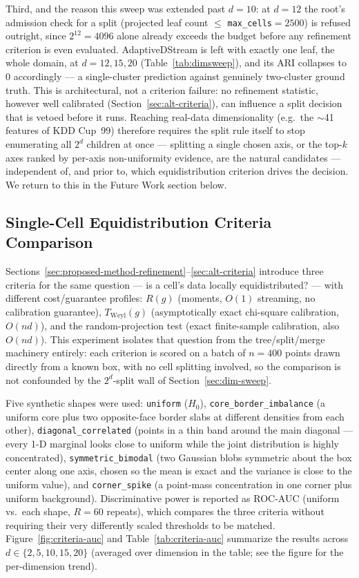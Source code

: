\documentclass[11pt]{article}
\begin{document}
Third, and the reason this sweep was extended past $d=10$: at $d=12$ the root's admission check for a split (projected leaf count $\le$ \texttt{max\_cells}$=2500$) is refused outright, since $2^{12}=4096$ alone already exceeds the budget before any refinement criterion is even evaluated. AdaptiveDStream is left with exactly one leaf, the whole domain, at $d=12,15,20$ (Table~\ref{tab:dimsweep}), and its ARI collapses to $0$ accordingly — a single-cluster prediction against genuinely two-cluster ground truth. This is architectural, not a criterion failure: no refinement statistic, however well calibrated (Section~\ref{sec:alt-criteria}), can influence a split decision that is vetoed before it runs. Reaching real-data dimensionality (e.g.\ the $\sim$41 features of KDD Cup~99) therefore requires the split rule itself to stop enumerating all $2^d$ children at once — splitting a single chosen axis, or the top-$k$ axes ranked by per-axis non-uniformity evidence, are the natural candidates — independent of, and prior to, which equidistribution criterion drives the decision. We return to this in the Future Work section below.

\subsection{Single-Cell Equidistribution Criteria Comparison}
\label{sec:criteria-comparison}

Sections~\ref{sec:proposed-method-refinement}--\ref{sec:alt-criteria} introduce three criteria for the same question — is a cell's data locally equidistributed? — with different cost/guarantee profiles: $R(g)$ (moments, $O(1)$ streaming, no calibration guarantee), $T_{\mathrm{Weyl}}(g)$ (asymptotically exact chi-square calibration, $O(nd)$), and the random-projection test (exact finite-sample calibration, also $O(nd)$). This experiment isolates that question from the tree/split/merge machinery entirely: each criterion is scored on a batch of $n=400$ points drawn directly from a known box, with no cell splitting involved, so the comparison is not confounded by the $2^d$-split wall of Section~\ref{sec:dim-sweep}.

Five synthetic shapes were used: \texttt{uniform} ($H_0$), \texttt{core\_border\_imbalance} (a uniform core plus two opposite-face border slabs at different densities from each other), \texttt{diagonal\_correlated} (points in a thin band around the main diagonal — every 1-D marginal looks close to uniform while the joint distribution is highly concentrated), \texttt{symmetric\_bimodal} (two Gaussian blobs symmetric about the box center along one axis, chosen so the mean is exact and the variance is close to the uniform value), and \texttt{corner\_spike} (a point-mass concentration in one corner plus uniform background). Discriminative power is reported as ROC-AUC (uniform vs.\ each shape, $R=60$ repeats), which compares the three criteria without requiring their very differently scaled thresholds to be matched. Figure~\ref{fig:criteria-auc} and Table~\ref{tab:criteria-auc} summarize the results across $d \in \{2,5,10,15,20\}$ (averaged over dimension in the table; see the figure for the per-dimension trend).
\end{document}
